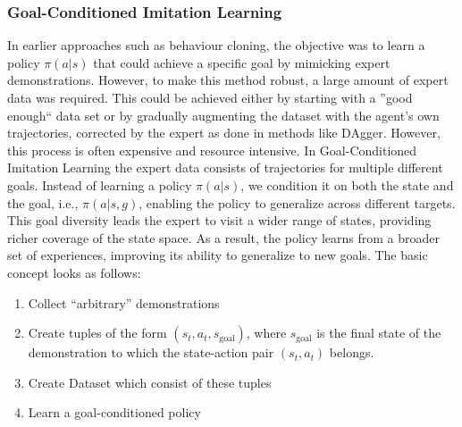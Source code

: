 \subsubsection{Goal-Conditioned Imitation Learning}
In earlier approaches such as behaviour cloning, the objective was to learn a policy $\pi(a|s)$ that could achieve a specific goal by 
mimicking expert demonstrations. However, to make this method robust, a large amount of expert data was required. This could be achieved 
either by starting with a ''good enough`` data set or by gradually augmenting the dataset with the agent’s own trajectories, corrected by the 
expert as done in methods like DAgger. However, this process is often expensive and resource intensive.\newline 
In Goal-Conditioned Imitation Learning  the expert data consists of trajectories for multiple different goals. 
Instead of learning a policy $\pi(a|s)$, we condition it on both the state and the goal, i.e., $\pi(a|s, g)$, enabling the policy to 
generalize across different targets. This goal diversity leads the expert to visit a wider range of states, providing richer coverage of the 
state space. As a result, the policy learns from a broader set of experiences, improving its ability to generalize to new goals. The basic 
concept looks as follows:
 \begin{enumerate}
\item Collect “arbitrary” demonstrations
\item Create tuples of the form $(s_t, a_t, s_{\text{goal}})$, where $s_{\text{goal}}$ is the final state of the demonstration to which the state-action pair $(s_t, a_t)$ belongs.
\item Create Dataset which consist of these tuples
\item Learn a goal-conditioned policy
\end{enumerate}

